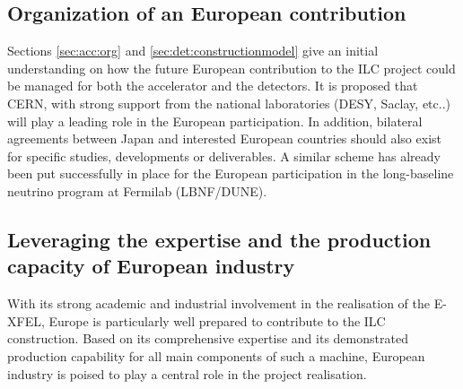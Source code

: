 \documentclass[%
 reprint,
 floatfix,
 amsmath,amssymb,
 aps,
]{revtex4-1}
\begin{document}

\subsection{\label{sec:discussionOrg} Organization of an European contribution}
Sections \ref{sec:acc:org} and \ref{sec:det:constructionmodel} give an initial understanding on how the future European contribution
to the ILC project could be managed for both the accelerator and the detectors. It is proposed that CERN, with strong support from the national laboratories (DESY, Saclay, etc..) will play a leading role in the European participation. In addition, bilateral agreements between Japan and interested European countries should also exist for specific studies, developments or deliverables. A similar scheme has already been put successfully in place for the European participation in the long-baseline neutrino program at Fermilab (LBNF/DUNE).

\subsection{\label{sec:discussionInd}Leveraging the expertise and the production capacity of European industry}
With its strong academic and industrial involvement in the realisation of the E-XFEL, Europe is particularly well prepared to contribute to the ILC construction. Based on its comprehensive expertise and its demonstrated production capability for all main components of such a machine, European industry is poised to play a central role in the project realisation. 
\end{document}
